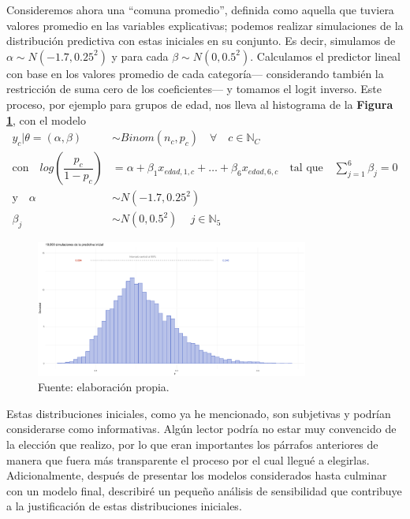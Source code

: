 Consideremos ahora una ``comuna promedio'', definida como aquella que tuviera valores promedio en las variables explicativas; podemos realizar simulaciones de la distribución predictiva con estas iniciales en su conjunto. Es decir, simulamos de $\alpha\sim N(-1.7,0.25^2)$ y para cada $\beta\sim N(0,0.5^2)$. Calculamos el predictor lineal con base en los valores promedio de cada categoría--- considerando también la restricción de suma cero de los coeficientes--- y tomamos el logit inverso. Este proceso, por ejemplo para grupos de edad, nos lleva al histograma de la \textbf{Figura \ref{fig:Predictiva_Inicial}}, con el modelo
\begin{align*}
y_c|\theta=(\alpha,\beta) & \sim Binom(n_c,p_c) \quad \forall \quad c \in \mathbb{N}_C \\
\text{con} \quad log\left(\dfrac{p_c}{1-p_c}\right) &= \alpha + \beta_1 x_{edad,1,c} + \dots + \beta_6 x_{edad,6,c} \quad \text{tal que} \quad \sum\limits_{j = 1}^6 \beta_j = 0 \nonumber \\
\text{y} \quad \alpha & \sim N(-1.7,0.25^2)\\
\beta_j & \sim N(0,0.5^2) \quad \, j \in \mathbb{N}_{5} 
\end{align*}

\begin{figure}[h]
	\centering
	\includegraphics[width = 0.8\textwidth]{Figs/Modelado/Pred_Inicial}
	\caption{Fuente: elaboración propia.}
	\label{fig:Predictiva_Inicial}
\end{figure}

Estas distribuciones iniciales, como ya he mencionado, son subjetivas y podrían considerarse como informativas. Algún lector podría no estar muy convencido de la elección que realizo, por lo que eran importantes los párrafos anteriores de manera que fuera más transparente el proceso por el cual llegué a elegirlas. Adicionalmente, después de presentar los modelos considerados hasta culminar con un modelo final, describiré un pequeño análisis de sensibilidad que contribuye a la justificación de estas distribuciones iniciales.\\  

